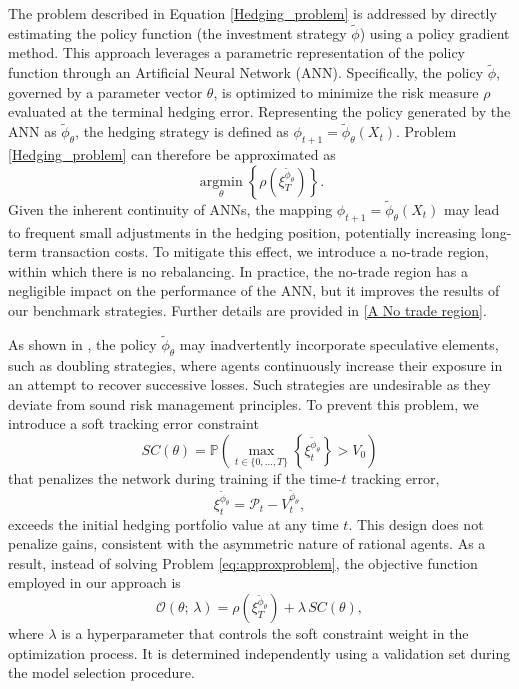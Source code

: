\documentclass[12pt]{article}
\begin{document}
The problem described in Equation \eqref{Hedging_problem} is addressed by directly estimating the policy function (the investment strategy $\tilde{\phi}$) using a policy gradient method. This approach leverages a parametric representation of the policy function through an Artificial Neural Network (ANN). Specifically, the policy $\tilde{\phi}$, governed by a parameter vector $\theta$, is optimized to minimize the risk measure $\rho$ evaluated at the terminal hedging error. Representing the policy generated by the ANN as $\tilde{\phi}_{\theta}$, the hedging strategy is defined as $\phi_{t+1}=\tilde{\phi}_{\theta}(X_{t})$. Problem \eqref{Hedging_problem} can therefore be approximated as
\begin{equation} 
\label{eq:approxproblem}
    \mathop{\arg \min}\limits_{\theta} \left\{\rho\left(\xi_{T}^{\tilde{\phi}_{\theta}}\right) \right\}. 
\end{equation}
Given the inherent continuity of ANNs, the mapping $\phi_{t+1}=\tilde{\phi}_{\theta}(X_{t})$ may lead to frequent small adjustments in the hedging position, potentially increasing long-term transaction costs. To mitigate this effect, we introduce a no-trade region, within which there is no rebalancing. In practice, the no-trade region has a negligible impact on the performance of the ANN, but it improves the results of our benchmark strategies. Further details are provided in \cref{A No trade region}.

As shown in \cite{François2025}, the policy $\tilde{\phi}_{\theta}$ may inadvertently incorporate speculative elements, such as doubling strategies, where agents continuously increase their exposure in an attempt to recover successive losses. Such strategies are undesirable as they deviate from sound risk management principles. To prevent this problem, we introduce a soft tracking error constraint
\begin{equation}
    \label{eq:soft_constraint}
    SC(\theta) = \mathbb{P}\left( \max_{t\in \{0,\dots,T \}} \left\{\xi_{t}^{\tilde{\phi}_{\theta}}\right\} > V_{0} \right)
\end{equation} 
that penalizes the network during training if the time-$t$ tracking error,
\begin{equation}\label{eq:tracking_error}
    \xi_{t}^{\tilde{\phi}_{\theta}} = \mathcal{P}_{t} - V_{t}^{\tilde{\phi}_{\theta}},
\end{equation}
exceeds the initial hedging portfolio value at any time $t$.  
This design does not penalize gains, consistent with the asymmetric nature of rational agents. As a result, instead of solving Problem \eqref{eq:approxproblem}, the objective function employed in our approach is 
\begin{equation}\label{eq:penaltyfunction}
    \mathcal{O}(\theta;\, \lambda) = \rho\left(\xi_{T}^{\tilde{\phi}_{\theta}}\right) + \lambda\, SC(\theta),
\end{equation}
where $\lambda$ is a hyperparameter  that controls the soft constraint weight in the optimization process. It is determined independently using a validation set during the model selection procedure.
\end{document}
